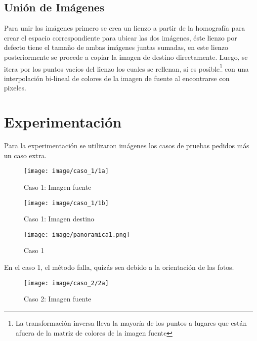 \documentclass[conference]{IEEEtran}
\begin{document}
	\subsection*{Unión de Imágenes}
		Para unir las imágenes primero se crea un lienzo a partir de la homografía para crear el espacio correspondiente para ubicar las dos imágenes, éste lienzo por defecto tiene el tamaño de ambas imágenes juntas sumadas, en este lienzo posteriormente se procede a copiar la imagen de destino directamente. Luego, se itera por los puntos vacíos del lienzo los cuales se rellenan, si es posible\footnote{La transformación inversa lleva la mayoría de los puntos a lugares que están afuera de la matriz de colores de la imagen fuente} con una interpolación bi-lineal de colores de la imagen de fuente al encontrarse con pixeles.


\section*{Experimentación}
	Para la experimentación se utilizaron imágenes los casos de pruebas pedidos más un caso extra.


\begin{figure}[H]
    \centering
    \texttt{[image: image/caso\_1/1a]} \par

\caption{Caso 1: Imagen fuente}
\end{figure}

\begin{figure}[H]
    \centering
   \texttt{[image: image/caso\_1/1b]} \par \par

\caption{Caso 1: Imagen destino}
\end{figure}


\begin{figure}[H]
    \centering
    \texttt{[image: image/panoramica1.png]} \par

\caption{Caso 1}
\end{figure}
	
	En el caso 1, el método falla, quizás sea debido a la orientación de las fotos.


\begin{figure}[H]
    \centering
    \texttt{[image: image/caso\_2/2a]} \par

\caption{Caso 2: Imagen fuente}
\end{figure}
\end{document}
